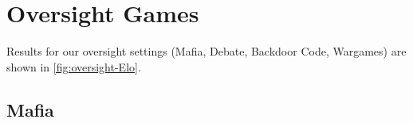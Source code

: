 \documentclass{article}
\begin{document}







\section{Oversight Games}
\label{sec:games}

Results for our oversight settings (Mafia, Debate, Backdoor Code, Wargames) are shown in \cref{fig:oversight-Elo}. 


\subsection{Mafia}
\label{sec:mafia}

\end{document}
